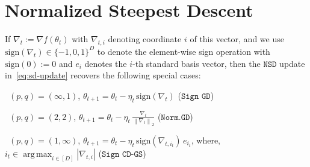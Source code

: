 \documentclass{article}
\newcommand{\norm}[1]{\left\|#1 \right\|}
\newcommand{\tht}{\theta_t}
\newcommand{\thtt}{\theta_{t+1}}
\newcommand{\etat}{{\eta_t}}
\DeclareMathOperator*{\argmax}{arg\,max}
\newcommand{\NSD}{\texttt{NSD}}
\newcommand{\NormGD}{\texttt{Norm.GD}}
\newcommand{\SignGD}{\texttt{Sign GD}}
\newcommand{\SignCD}{\texttt{Sign CD-GS}}
\begin{document}
\section{Normalized Steepest Descent}
\label{app:sd}

\begin{proposition}
If $\nabla_t := \nabla f(\tht)$ with $\nabla_{t,i}$ denoting coordinate $i$ of this vector, and we use $\text{sign}(\nabla_t) \in \{-1,0,1\}^{D}$ to denote the element-wise sign operation with $\text{sign}(0) := 0$ and $e_i$ denotes the \(i\)-th standard basis vector, then the $\NSD$ update in~\cref{eq:sd-update} recovers the following special cases:

\textbullet\ $(p,q) = (\infty,1)$, $\thtt = \tht - \etat \, \text{sign}(\nabla_{t})$ ($\SignGD$)

\textbullet\ $(p,q) = (2,2)$, $\thtt = \tht - \etat \, \frac{\nabla_t}{\norm{\nabla_t}_2}$ ($\NormGD$)

\textbullet\ $(p,q) = (1,\infty)$, $\thtt = \tht - \etat \, \text{sign}(\nabla_{t,i_t}) \, e_{i_t}$, where, $i_t \in \argmax_{i \in [D]}|\nabla_{t,i}|$ ($\SignCD$)

\label{prop:nsd-derivation}
\end{proposition}
\end{document}
